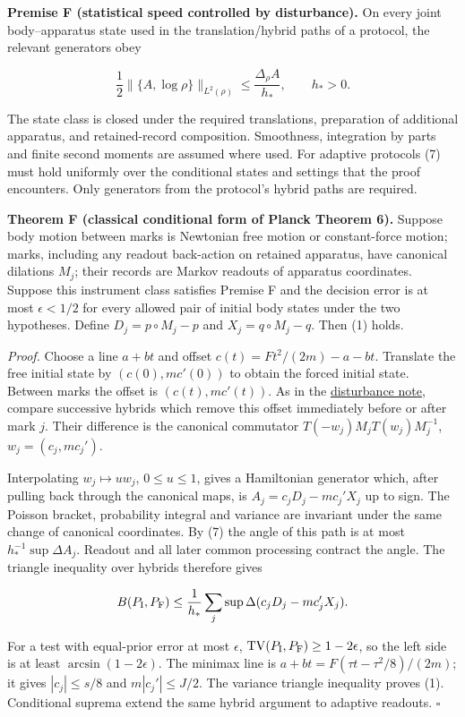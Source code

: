 \documentclass[11pt,a4paper]{article}
\begin{document}
\textbf{Premise F (statistical speed controlled by disturbance).} On
every joint body--apparatus state used in the translation/hybrid paths
of a protocol, the relevant generators obey

\[\frac12\|\{A,\log\rho\}\|_{L^2(\rho)}
\le\frac{\Delta_\rho A}{h_*},\qquad h_*>0. \tag{7}\]

The state class is closed under the required translations, preparation
of additional apparatus, and retained-record composition. Smoothness,
integration by parts and finite second moments are assumed where used.
For adaptive protocols (7) must hold uniformly over the conditional
states and settings that the proof encounters. Only generators from the
protocol's hybrid paths are required.

\textbf{Theorem F (classical conditional form of Planck Theorem 6).}
Suppose body motion between marks is Newtonian free motion or
constant-force motion; marks, including any readout back-action on
retained apparatus, have canonical dilations \(M_j\); their records are
Markov readouts of apparatus coordinates. Suppose this instrument class
satisfies Premise F and the decision error is at most \(\epsilon<1/2\)
for every allowed pair of initial body states under the two hypotheses.
Define \(D_j=p\circ M_j-p\) and \(X_j=q\circ M_j-q\). Then (1) holds.

\emph{Proof.} Choose a line \(a+bt\) and offset \(c(t)=Ft^2/(2m)-a-bt\).
Translate the free initial state by \((c(0),mc'(0))\) to obtain the
forced initial state. Between marks the offset is \((c(t),mc'(t))\). As
in the
\href{record-distance-path-length.md\#general-disturbance-theorem-with-an-unknown-preparation}{disturbance
note}, compare successive hybrids which remove this offset immediately
before or after mark \(j\). Their difference is the canonical commutator
\(T(-w_j)M_jT(w_j)M_j^{-1}\), \(w_j=(c_j,mc_j')\).

Interpolating \(w_j\mapsto u w_j\), \(0\le u\le1\), gives a Hamiltonian
generator which, after pulling back through the canonical maps, is
\(A_j=c_jD_j-mc_j'X_j\) up to sign. The Poisson bracket, probability
integral and variance are invariant under the same change of canonical
coordinates. By (7) the angle of this path is at most
\(h_*^{-1}\sup\Delta A_j\). Readout and all later common processing
contract the angle. The triangle inequality over hybrids therefore gives

\[B(P_{\rm I},P_{\rm F})\le
\frac1{h_*}\sum_j\sup\Delta(c_jD_j-mc_j'X_j).\]

For a test with equal-prior error at most \(\epsilon\),
\(\mathrm{TV}(P_{\rm I},P_{\rm F})\ge1-2\epsilon\), so the left side is
at least \(\arcsin(1-2\epsilon)\). The minimax line is
\(a+bt=F(\tau t-\tau^2/8)/(2m)\); it gives \(|c_j|\le s/8\) and
\(m|c_j'|\le J/2\). The variance triangle inequality proves (1).
Conditional suprema extend the same hybrid argument to adaptive
readouts. \(\square\)
\end{document}
